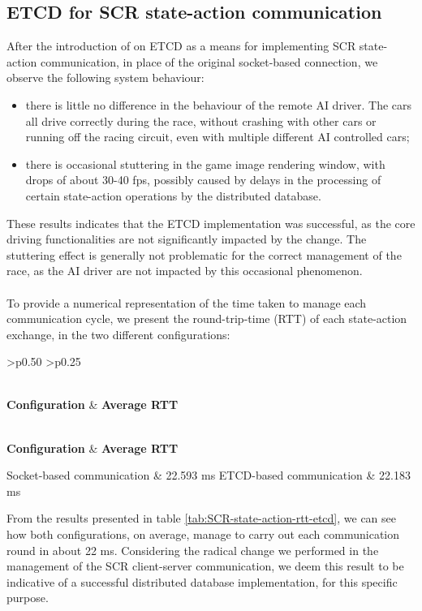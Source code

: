 \subsection{ETCD for SCR state-action communication}
After the introduction of on ETCD as a means for implementing SCR state-action communication, in place of the original socket-based connection, we observe the following system behaviour:
\begin{itemize}
	\item there is little no difference in the behaviour of the remote AI driver. The cars all drive correctly during the race, without crashing with other cars or running off the racing circuit, even with multiple different AI controlled cars;
	\item there is occasional stuttering in the game image rendering window, with drops of about 30-40 fps, possibly caused by delays in the processing of certain state-action operations by the distributed database.
\end{itemize}
These results indicates that the ETCD implementation was successful, as the core driving functionalities are not significantly impacted by the change. The stuttering effect is generally not problematic for the correct management of the race, as the AI driver are not impacted by this occasional phenomenon. \\ \\
To provide a numerical representation of the time taken to manage each communication cycle, we present the round-trip-time (RTT) of each state-action exchange, in the two different configurations:

\def\arraystretch{1.75}
\begin{longtable}{ 
		>{\centering}p{} 
		>{\centering}p{}}
	
	
	\caption{SCR state-action communication RTT - ETCD comparison} \label{tab:SCR-state-action-rtt-etcd} \\
	\textbf{\color{white}Configuration} & 
	\centering\textbf{\color{white}Average RTT}
	\endfirsthead
	
	\caption[]{(continue)}\\
	\textbf{\color{white}Configuration} & 
	\centering\textbf{\color{white}Average RTT}
	\endhead
	
	Socket-based communication & 22.593 ms \cr
	ETCD-based communication & 22.183 ms \cr
\end{longtable}
From the results presented in table \ref{tab:SCR-state-action-rtt-etcd}, we can see how both configurations, on average, manage to carry out each communication round in about 22 ms. Considering the radical change we performed in the management of the SCR client-server communication, we deem this result to be indicative of a successful distributed database implementation, for this specific purpose.

